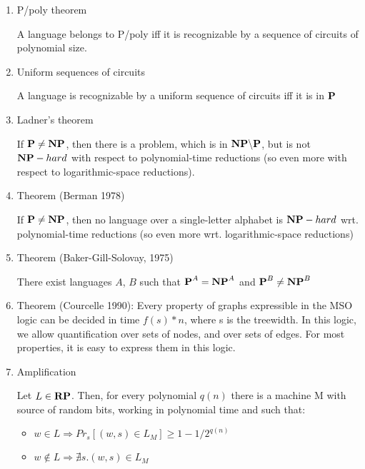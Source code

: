 \begin{enumerate}
    \item P/poly theorem
    
    A language belongs to P/poly iff it is recognizable by a sequence of circuits of polynomial size.
    
    \item Uniform sequences of circuits
    
    A language is recognizable by a uniform sequence of circuits iff it is in $\P$
    
    \item Ladner's theorem
    
    If $\P \neq \NP$, then there is a problem, which is in $\NP \backslash \P$, but is not  $\NP-hard$ with respect to polynomial-time reductions (so even more with respect to logarithmic-space reductions).
    
    
    \item Theorem (Berman 1978)
    
    If $\P \neq \NP$, then no language over a single-letter alphabet is $\NP-hard$ wrt. polynomial-time reductions (so even more wrt. logarithmic-space reductions)
    
   
    
    
    \item Theorem (Baker-Gill-Solovay, 1975)
    
     There exist languages $A$, $B$ such that $\P^A=\NP^A$ and $\P^B \neq \NP^B$

    \item Theorem (Courcelle 1990):
    Every property of graphs expressible in the MSO logic can be
    decided in time $f(s) * n$, where s is the treewidth.
    In this logic, we allow quantification over sets of nodes, and over sets of edges. For most properties, it is easy to express them in this logic.
    
    \item Amplification
    
    Let $L \in \RP$. Then, for every polynomial $q(n)$ there is a machine M with source of random bits, working in polynomial time and such that:
    \begin{itemize}
        \item $w \in L \Rightarrow Pr_s[(w,s) \in L_M] \geq 1-1/2^{q(n)}$
        \item $w \notin L \Rightarrow \nexists s. (w,s) \in L_M$
    \end{itemize}
\end{enumerate}
